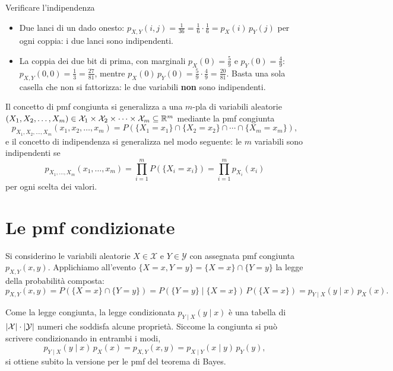 \begin{esempio}{Verificare l'indipendenza}
\begin{itemize}
  \item Due lanci di un dado onesto: $p_{X,Y}(i, j) = \frac{1}{36} = \frac16 \cdot \frac16 = p_X(i)\, p_Y(j)$ per ogni
        coppia: i due lanci sono indipendenti.
  \item La coppia dei due bit di prima, con marginali $p_X(0) = \frac59$ e $p_Y(0) = \frac49$:
        $p_{X,Y}(0, 0) = \frac13 = \frac{27}{81}$, mentre $p_X(0)\, p_Y(0) = \frac59 \cdot \frac49 = \frac{20}{81}$. Basta
        una sola casella che non si fattorizza: le due variabili \textbf{non} sono indipendenti.
\end{itemize}
\end{esempio}

Il concetto di pmf congiunta si generalizza a una $m$-pla di variabili aleatorie
$(X_1, X_2, \ldots, X_m) \in \mathcal{X}_1 \times \mathcal{X}_2 \times \cdots \times \mathcal{X}_m \subseteq \mathbb{R}^m$
mediante la pmf congiunta
\[ p_{X_1, X_2, \ldots, X_m}(x_1, x_2, \ldots, x_m) = P\left(\{X_1 = x_1\} \cap \{X_2 = x_2\} \cap \cdots \cap
   \{X_m = x_m\}\right) , \]
e il concetto di indipendenza si generalizza nel modo seguente: le $m$ variabili sono indipendenti se
\[ p_{X_1, \ldots, X_m}(x_1, \ldots, x_m) = \prod_{i=1}^{m} P(\{X_i = x_i\}) = \prod_{i=1}^{m} p_{X_i}(x_i) \]
per ogni scelta dei valori.

\section{Le pmf condizionate}

Si considerino le variabili aleatorie $X \in \mathcal{X}$ e $Y \in \mathcal{Y}$ con assegnata pmf congiunta
$p_{X,Y}(x, y)$. Applichiamo all'evento $\{X = x, Y = y\} = \{X = x\} \cap \{Y = y\}$ la legge della probabilità
composta:
\[ p_{X,Y}(x, y) = P(\{X = x\} \cap \{Y = y\}) = P(\{Y = y\} \mid \{X = x\})\, P(\{X = x\})
   = p_{Y \mid X}(y \mid x)\, p_X(x) . \]


Come la legge congiunta, la legge condizionata $p_{Y \mid X}(y \mid x)$ è una tabella di $\left\lvert \mathcal{X} \right\rvert \cdot
\left\lvert \mathcal{Y} \right\rvert$ numeri che soddisfa alcune proprietà. Siccome la congiunta si può scrivere condizionando in
entrambi i modi,
\[ p_{Y \mid X}(y \mid x)\, p_X(x) = p_{X,Y}(x, y) = p_{X \mid Y}(x \mid y)\, p_Y(y) , \]
si ottiene subito la versione per le pmf del teorema di Bayes.

